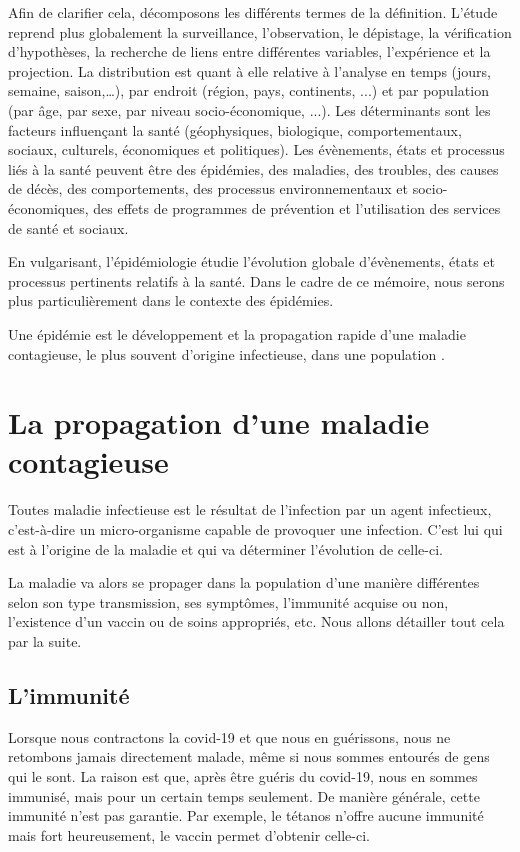 \documentclass[french]{report}
\begin{document}
Afin de clarifier cela, décomposons les différents termes de la définition. L'étude reprend plus globalement la surveillance, l'observation, le dépistage, la vérification d'hypothèses, la recherche de liens entre différentes variables, l'expérience et la projection. La distribution est quant à elle relative à l'analyse en temps (jours, semaine, saison,\dots), par endroit (région, pays, continents, ...) et par population (par âge, par sexe, par niveau socio-économique, ...). Les déterminants  sont les facteurs influençant la santé (géophysiques, biologique, comportementaux, sociaux, culturels, économiques et politiques). Les évènements, états et processus liés à la santé peuvent être des épidémies, des maladies, des troubles, des causes de décès, des comportements, des processus environnementaux et socio-économiques, des effets de programmes de prévention et l'utilisation des services de santé et sociaux.

En vulgarisant, l'épidémiologie étudie l'évolution globale d'évènements, états et processus pertinents relatifs à la santé. Dans le cadre de ce mémoire, nous serons plus particulièrement dans le contexte des épidémies.

Une épidémie est le développement et la propagation rapide d'une maladie contagieuse, le plus souvent d'origine infectieuse, dans une population \cite{larousseOnline2023}.

\section{La propagation d'une maladie contagieuse}

Toutes maladie infectieuse est le résultat de l'infection par un agent infectieux, c'est-à-dire un micro-organisme capable de provoquer une infection.
C'est lui qui est à l'origine de la maladie et qui va déterminer l'évolution de celle-ci.

La maladie va alors se propager dans la population d'une manière différentes selon son type transmission, ses symptômes, l'immunité acquise ou non, l'existence d'un vaccin ou de soins appropriés, etc. Nous allons détailler tout cela par la suite. 

\subsection*{L'immunité}

Lorsque nous contractons la covid-19 et que nous en guérissons, nous ne retombons jamais directement malade, même si nous sommes entourés de gens qui le sont. La raison est que, après être guéris du covid-19, nous en sommes immunisé, mais pour un certain temps seulement.  De manière générale, cette immunité n'est pas garantie. Par exemple, le tétanos n'offre aucune immunité mais fort heureusement, le vaccin permet d'obtenir celle-ci.
\end{document}
